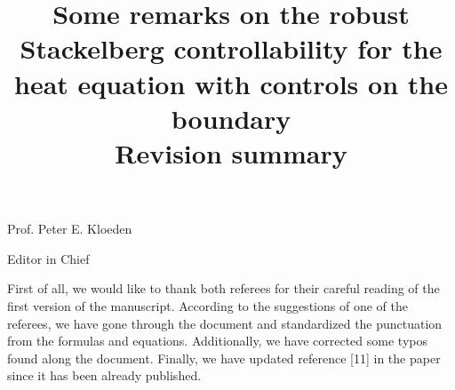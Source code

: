 \documentclass[final,10pt]{article}
\numberwithin{equation}{section}
\numberwithin{theorem}{section}
\begin{document}
\title{{\bf Some remarks on the robust Stackelberg controllability for the heat equation with controls on the boundary}\\
Revision summary}


\maketitle

Prof. Peter E. Kloeden

Editor in Chief

\vspace{0.5 cm}

First of all, we would like to thank both referees for their careful reading of the first version of the manuscript. According to the suggestions of one of the referees, we have gone through the document and standardized the punctuation from the formulas and equations. Additionally, we have corrected some typos found along the document. Finally, we have updated reference [11] in the paper since it has been already published. 


\end{document}
